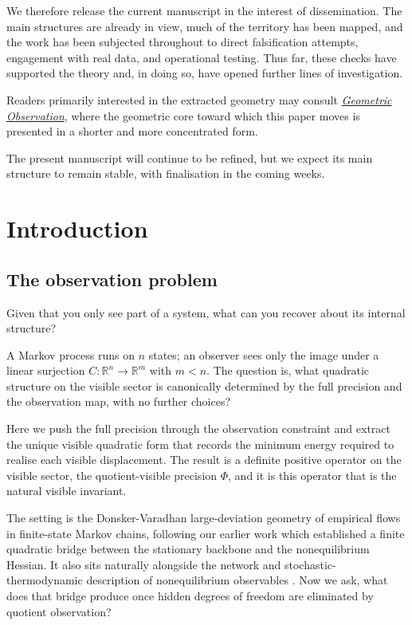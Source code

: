 \documentclass[11pt]{article}
\numberwithin{equation}{section}
\theoremstyle{thmcompact}
\theoremstyle{remark}
\begin{document}
We therefore release the current manuscript in the interest of dissemination. The main structures are already in view, much of the territory has been mapped, and the work has been subjected throughout to direct falsification attempts, engagement with real data, and operational testing. Thus far, these checks have supported the theory and, in doing so, have opened further lines of investigation.

Readers primarily interested in the extracted geometry may consult \href{https://doi.org/10.5281/zenodo.19361501}{\emph{Geometric Observation}}, where the geometric core toward which this paper moves is presented in a shorter and more concentrated form.

The present manuscript will continue to be refined, but we expect its main structure to remain stable, with finalisation in the coming weeks.
\newpage

\section{Introduction}
\label{sec:01_introduction}

\subsection{The observation problem}

Given that you only see part of a system, what can you recover about its internal structure?

A Markov process runs on $n$ states; an observer sees only the image under a linear surjection $C : \mathbb{R}^n \to \mathbb{R}^m$ with $m < n$. The question is, what quadratic structure on the visible sector is canonically determined by the full precision and the observation map, with no further choices?

Here we push the full precision through the observation constraint and extract the unique visible quadratic form that records the minimum energy required to realise each visible displacement. The result is a definite positive operator on the visible sector, the quotient-visible precision $\Phi$, and it is this operator that is the natural visible invariant.

The setting is the Donsker-Varadhan large-deviation geometry of empirical flows in finite-state Markov chains, \cite{DonskerVaradhan1975a,DonskerVaradhan1975b,DonskerVaradhan1976,Ellis1985,Touchette2009,BertiniFaggionatoGabrielli2015} following our earlier work \cite{Dunkley2026FiniteObservation} which established a finite quadratic bridge between the stationary backbone and the nonequilibrium Hessian. It also sits naturally alongside the network and stochastic-thermodynamic description of nonequilibrium observables \cite{Schnakenberg1976,LebowitzSpohn1999,Seifert2012,Esposito2012,Maes2020}. Now we ask, what does that bridge produce once hidden degrees of freedom are eliminated by quotient observation?
\end{document}
